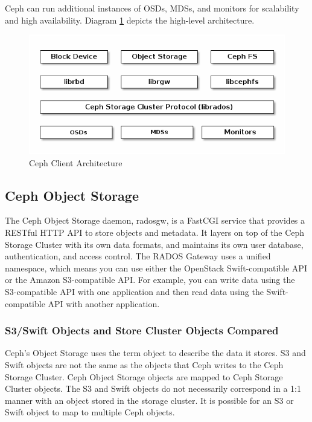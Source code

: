 \documentclass[12pt,a4paper]{report}
\begin{document}
Ceph can run additional instances of OSDs, MDSs, and monitors for scalability
and high availability. Diagram \ref{fig:client_architecture} depicts the
high-level architecture.

\begin{figure}[h]
	\includegraphics[scale=0.60]{client_architecture.png}
	\caption{Ceph Client Architecture}
	\label{fig:client_architecture}
\end{figure}

\subsection{Ceph Object Storage}

The Ceph Object Storage daemon, radosgw, is a FastCGI service that provides a
RESTful HTTP API to store objects and metadata. It layers on top of the Ceph
Storage Cluster with its own data formats, and maintains its own user database,
authentication, and access control. The RADOS Gateway uses a unified namespace,
which means you can use either the OpenStack Swift-compatible API or the Amazon
S3-compatible API. For example, you can write data using the S3-compatible API
with one application and then read data using the Swift-compatible API with
another application.

\subsubsection{S3/Swift Objects and Store Cluster Objects Compared}

Ceph’s Object Storage uses the term object to describe the data it stores. S3
and Swift objects are not the same as the objects that Ceph writes to the Ceph
Storage Cluster. Ceph Object Storage objects are mapped to Ceph Storage Cluster
objects. The S3 and Swift objects do not necessarily correspond in a 1:1 manner
with an object stored in the storage cluster. It is possible for an S3 or Swift
object to map to multiple Ceph objects.
\end{document}
